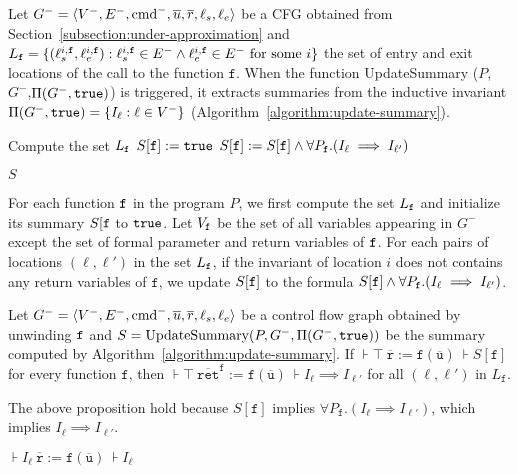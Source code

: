 Let $G^- = \langle V^-, E^-, \textmd{cmd}^-, \overline{u}, \overline{r},\ell_s,\ell_e \rangle$ be a CFG obtained from Section~\ref{subsection:under-approximation} and $L_{\mathtt{{f}}}=\{(\ell_s^{i,\mathtt{{f}}},\ell_e^{i,\mathtt{{f}}}):\ell_s^{i,\mathtt{{f}}}\in E^- \wedge \ell_e^{i,\mathtt{{f}}}\in E^-\mbox{ for some }i\}$
the set of entry and exit locations of the call to the function $\mathtt{f}$.
When the function UpdateSummary ($P$, $G^-$,$\Pi (G^-, \mathtt{true})$) is triggered, it extracts summaries from the inductive invariant $\Pi (G^-, \mathtt{true})= \{ I_\ell : \ell \in V^-
\}$ (Algorithm~\ref{algorithm:update-summary}). 

\begin{algorithm}

  {	
  	Compute the set $L_{\mathtt{{f}}}$\;
  	$S[\mathtt{{f}}]:=\mathtt{true}$\;
   	{
       	{
         		$S[\mathtt{{f}}]:=S[\mathtt{{f}}]\wedge \forall P_\mathtt{f}. (I_\ell \implies I_{\ell'})$\;
       	}	
   	}
    
  }
 
  \Return $S$\;
  \caption{$\textmd{UpdateSummary} (P, G^-,\Pi (G^-, \TT))$}
  \label{algorithm:update-summary}
\end{algorithm}

For each function $\mathtt{{f}}$ in the program $P$, we first compute the set $L_{\mathtt{{f}}}$  and initialize its summary $S[\mathtt{{f}}$ to $\mathtt{true}$.
Let $V_{\mathtt{{f}}}$ be the set of all variables appearing in $G^-$ except the set of formal parameter and return variables of $\mathtt{{f}}$.
For each pairs of locations $(\ell,\ell')$ in the set $L_{\mathtt{{f}}}$, if the invariant of location $i$ does not contains any return variables of $\mathtt{f}$, we update $S[\mathtt{{f}}]$ to the formula $S[\mathtt{{f}}]\wedge \forall P_\mathtt{f}. (I_\ell \implies I_{\ell'})$.


\begin{proposition}
  \label{propposition:strengthen_postcondition}
  Let $G^- = \langle V^-, E^-, \textmd{cmd}^-, \overline{u}, \overline{r},\ell_s,\ell_e \rangle$ be a control flow graph obtained by unwinding $\mathtt{{f}}$ and $S=\textmd{UpdateSummary} (P, G^-,\Pi (G^-, \mathtt{true}))$ be the summary computed by Algorithm~\ref{algorithm:update-summary}.
  If $\assert{\top}\ \mathtt{\overline{r}} :=
    \mathtt{f} (\overline{\mathtt{u}})\ \assert{S[\mathtt{f}]}$ for every
  function $\mathtt{f}$, then $\assert{\top}\ \mathtt{\overline{ret}^f} :=
  \mathtt{f} (\overline{\mathtt{u}})\ \assert{I_\ell \implies I_{\ell'}}$ for all $(\ell,\ell')$ in $L_\mathtt{f}$.
\end{proposition}
The above proposition hold because $S[\mathtt{f}]$ implies $\forall P_\mathtt{f}. (I_\ell \implies I_{\ell'})$, which implies $I_\ell \implies I_{\ell'}$.

\begin{proposition}
\label{propposition:invariant}
$\assert{I_\ell}\ \mathtt{\overline{r}} :=
    \mathtt{f} (\overline{\mathtt{u}})\ \assert{I_\ell}$
\end{proposition}